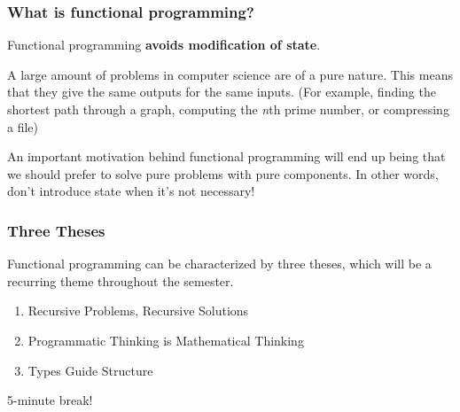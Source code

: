 \documentclass[aspectratio=169]{beamer}
\begin{document}
\begin{frame}[fragile]
  \frametitle{What is functional programming?}

  Functional programming \textbf{avoids modification of state}.

  \pause
  \vspace{\fill}


  \pause
  \vspace{\fill}

  A large amount of problems in computer science are of a pure nature. This means that they
  give the same outputs for the same inputs.
  (For example, finding the shortest path through a graph, computing the \textit{n}th prime
  number, or compressing a file)

  \pause
  \vspace{5pt}

  An important motivation behind functional programming will end up being that we should 
  prefer to solve pure problems with pure components. In other words, don't introduce state
  when it's not necessary!
\end{frame}

\begin{frame}[fragile]
  \frametitle{Three Theses}
  \vspace{\fill}

  Functional programming can be characterized by three theses, which will be a recurring
  theme throughout the semester. 

  \pause 

  \vspace{\fill}

  { \Large
  \begin{enumerate}
    \item Recursive Problems, Recursive Solutions
    \pause
    \vspace{\fill}
    \item Programmatic Thinking is Mathematical Thinking
    \pause
    \vspace{\fill}
    \item Types Guide Structure
  \end{enumerate}
  }

\end{frame}

\begin{frame}[plain]

  \begin{center}
    \Large 5-minute break!
  \end{center}

\end{frame}
\end{document}
